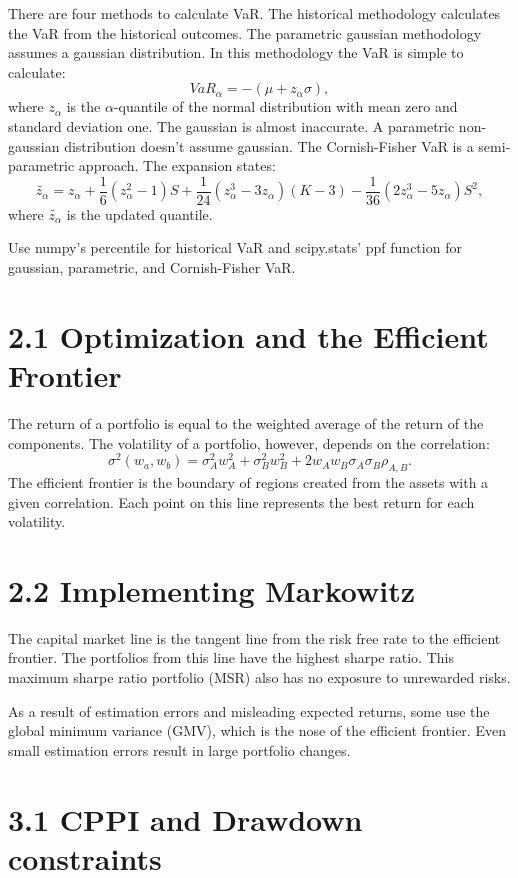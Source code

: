 \documentclass{article}
\begin{document}
There are four methods to calculate VaR.
The historical methodology calculates the VaR 
from the historical outcomes. The parametric gaussian
methodology assumes a gaussian distribution. In
this methodology the VaR is simple to calculate:
\[
VaR_\alpha = -(\mu + z_\alpha \sigma),
\]
where $z_\alpha$ is the $\alpha$-quantile of the
normal distribution with mean zero and standard
deviation one. The gaussian is almost inaccurate.
A parametric non-gaussian distribution doesn't
assume gaussian. The Cornish-Fisher VaR is a
semi-parametric approach. The expansion states:
\[
\tilde{z_\alpha} = z_\alpha + 
\frac{1}{6}(z_\alpha^2 - 1)S + 
\frac{1}{24}(z_\alpha^3 - 3z_\alpha)(K-3) -
\frac{1}{36}(2z_\alpha^3 - 5z_\alpha)S^2,
\] 
where $\tilde{z_\alpha}$ is the updated quantile.

Use numpy's percentile for historical VaR and
scipy.stats' ppf function for gaussian, parametric,
and Cornish-Fisher VaR.

\section*{2.1 Optimization and the Efficient Frontier}

The return of a portfolio is equal to the 
weighted average of the return of the components.
The volatility of a portfolio, however, depends
on the correlation:
\[
\sigma^2(w_a, w_b) =
\sigma^2_A w^2_A + \sigma^2_B w^2_B + 
2 w_A w_B \sigma_A \sigma_B \rho_{A,B}.
\]
The efficient frontier is the boundary of regions
created from the assets with a given correlation.
Each point on this line represents the best return
for each volatility. 

\section*{2.2 Implementing Markowitz}

The capital market line is the tangent line
from the risk free rate to the efficient frontier.
The portfolios from this line have the highest 
sharpe ratio. This maximum sharpe ratio portfolio (MSR)
also has no exposure to unrewarded risks. 

As a result of estimation errors and misleading
expected returns, some use the global minimum variance
(GMV), which is the nose of the efficient frontier. 
Even small estimation errors result in large portfolio
changes. 

\section*{3.1 CPPI and Drawdown constraints}
\end{document}
